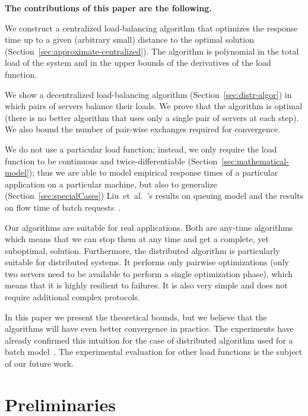 \documentclass[11pt]{article}
\begin{document}
\medskip
\textbf{The contributions of this paper are the following.}
\begin{inparaenum}[(i)] 
\item We construct a centralized load-balancing algorithm that optimizes the response time up to a given (arbitrary small) distance to the optimal solution (Section~\ref{sec:approximate-centralized}). 
The algorithm is polynomial in the total load of the system and in the upper bounds of the derivatives of the load function.
\item We show a decentralized load-balancing algorithm (Section~\ref{sec:distr-algor}) in which pairs of servers balance their loads. We prove that the algorithm is optimal (there is no better algorithm that uses only a single pair of servers at each step). We also bound the number of pair-wise exchanges required for convergence.
\item We do not use a particular load function; instead, we only require the load function to be continuous and twice-differentiable (Section~\ref{sec:mathematical-model}); 
thus we are able to model empirical response times of a particular application on a particular machine,
but also to generalize (Section~\ref{sec:specialCases}) Liu~et~al.~\cite{Liu:2011:GGL:1993744.1993767}'s results on queuing model and the results on flow time of batch requests~\cite{Skowron:2013:NDL:2510648.2510769}.
\end{inparaenum}





Our algorithms are suitable for real applications. Both are any-time algorithms which means that we can stop them at any time and get a complete, yet suboptimal, solution.
Furthermore, the distributed algorithm is particularly suitable for distributed systems. It performs only pairwise optimizations (only two servers need to be available to perform a single optimization phase), which means that it is highly resilient to failures. It is also very simple and does not require additional complex protocols.

In this paper we present the theoretical bounds, but we believe that the algorithms will have even better convergence in practice. The experiments have already confirmed this intuition for the case of distributed algorithm used for a batch model~\cite{Skowron:2013:NDL:2510648.2510769}. The experimental evaluation for other load functions is the subject of our future work.

\section{Preliminaries}
\end{document}
